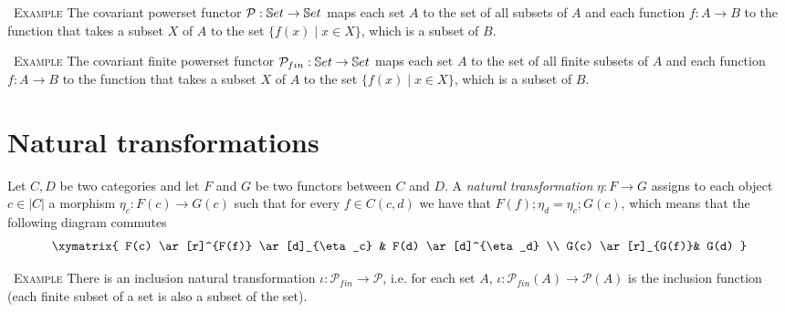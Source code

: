 \documentclass[10pt,fleqn,final]{scrreprt}
\newcommand{\informative}[0]{{\begin{center}{\Large{(Informative})}\end{center}} \bigskip}
\newcommand{\infannex}[1]{ \chapter{Annex: #1}  \informative }
\newenvironment{example}[0]{\ \newline \textsc{Example}\quad }{}
\newcommand\blankpage{%
    \null
    \thispagestyle{empty}%
    \addtocounter{page}{-1}%
    \newpage}
\begin{document}
\begin{example}
 The covariant powerset functor $\mathcal{P} : \mathbb{S}et \to \mathbb{S}et$
 maps each set $A$ to the set of all subsets of $A$ and each function $f:A \to B$
 to the function that takes a subset $X$ of $A$ to the set $\{f(x) \mid x\in X\}$,
 which is a subset of $B$. 
 \end{example}

\begin{example}
 The covariant finite powerset functor $\mathcal{P}_{fin} : \mathbb{S}et \to \mathbb{S}et$
 maps each set $A$ to the set of all finite subsets of $A$ and each function $f:A \to B$
 to the function that takes a subset $X$ of $A$ to the set $\{f(x) \mid x\in X\}$,
 which is a subset of $B$. 
 \end{example}
 
 \section{Natural transformations}

\begin{definition}
 Let $C, D$ be two categories and let $F$ and $G$ be two functors between $C$ and $D$.
 A \emph{natural transformation} $\eta : F \to G$ assigns to each object $c\in |C|$ a
 morphism $\eta_c : F(c) \to G(c) $ such that for every $f\in C(c,d)$ we have that 
 $F(f);\eta_d = \eta_c;G(c)$, which means that the following diagram commutes
 $$
 \xymatrix{
 F(c) \ar[r]^{F(f)} \ar[d]_{\eta_c} & F(d) \ar[d]^{\eta_d} \\
 G(c) \ar[r]_{G(f)}& G(d) 
 }$$ 
\end{definition}

\begin{example}
 There is an inclusion natural transformation $\iota:\mathcal{P}_{fin}\to\mathcal{P}$,
 i.e. for each set $A$, $\iota : \mathcal{P}_{fin}(A)\to\mathcal{P}(A)$ is the inclusion
 function (each finite subset of a set is also a subset of the set).
\end{example}

\newpage

\clearpage

 
\renewcommand{\bibname}{References}
\label{a:bibliography}




%
%
\end{document}
